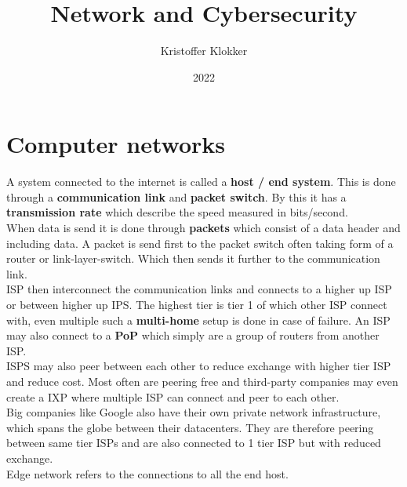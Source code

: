 \documentclass[12pt, a4paper]{article}
\title{Network and Cybersecurity}
\date{2022}
\author{Kristoffer Klokker}
\begin{document}
	\maketitle
	\clearpage
	\tableofcontents
	\clearpage
	\section{Computer networks}
		A system connected to the internet is called a \textbf{host / end system}. This is done through a \textbf{communication link} and \textbf{packet switch}. By this it has a \textbf{transmission rate} which describe the speed measured in bits/second.\\
		When data is send it is done through \textbf{packets} which consist of a data header and including data. A packet is send first to the packet switch often taking form of a router or link-layer-switch. Which then sends it further to the communication link.\\
		ISP then interconnect the communication links and connects to a higher up ISP or between higher up IPS. The highest tier is tier 1 of which other ISP connect with, even multiple such a \textbf{multi-home} setup is done in case of failure. An ISP may also connect to a \textbf{PoP} which simply are a group of routers from another ISP.\\
		ISPS may also peer between each other to reduce exchange with higher tier ISP and reduce cost. Most often are peering free and third-party companies may even create a IXP where multiple ISP can connect and peer to each other.\\
		Big companies like Google also have their own private network infrastructure, which spans the globe between their datacenters. They are therefore peering between same tier ISPs and are also connected to 1 tier ISP but with reduced exchange.\\
		Edge network refers to the connections to all the end host.
\end{document}

